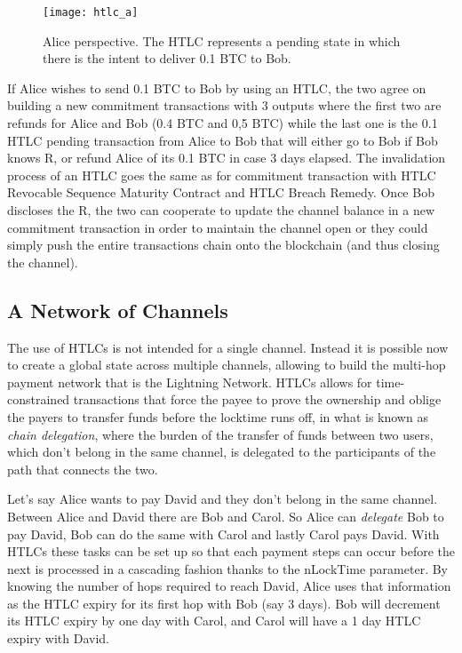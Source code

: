 		\begin{figure}
			\centering
			\texttt{[image: htlc\_a]}
			\caption{Alice perspective. The HTLC represents a pending state in which there is the intent to deliver 0.1 BTC to Bob.}
			\label{htlc_a}
		\end{figure}
	
		If Alice wishes to send 0.1 BTC to Bob by using an HTLC, the two agree on building a new commitment transactions with 3 outputs where the first two are refunds for Alice and Bob (0.4 BTC and 0,5 BTC) while the last one is the 0.1 HTLC pending transaction from Alice to Bob that will either go to Bob if Bob knows R, or refund Alice of its 0.1 BTC in case 3 days elapsed. The invalidation process of an HTLC goes the same as for commitment transaction with HTLC Revocable Sequence Maturity Contract and HTLC Breach Remedy. Once Bob discloses the R, the two can cooperate to update the channel balance in a new commitment transaction in order to maintain the channel open or they could simply push the entire transactions chain onto the blockchain (and thus closing the channel).
		
		\subsection{A Network of Channels}
		
		The use of HTLCs is not intended for a single channel. Instead it is possible now to create a global state across multiple channels, allowing to build the multi-hop payment network that is the Lightning Network. HTLCs allows for time-constrained transactions that force the payee to prove the ownership and oblige the payers to transfer funds before the locktime runs off, in what is known as \textit{chain delegation}, where the burden of the transfer of funds between two users, which don't belong in the same channel, is delegated to the participants of the path that connects the two.

		Let's say Alice wants to pay David and they don't belong in the same channel. Between Alice and David there are Bob and Carol. So Alice can \textit{delegate} Bob to pay David, Bob can do the same with Carol and lastly Carol pays David. With HTLCs these tasks can be set up so that each payment steps can occur before the next is processed in a cascading fashion thanks to the nLockTime parameter. By knowing the number of hops required to reach David, Alice uses that information as the HTLC expiry for its first hop with Bob (say 3 days). Bob will decrement its HTLC expiry by one day with Carol, and Carol will have a 1 day HTLC expiry with David. 
		
